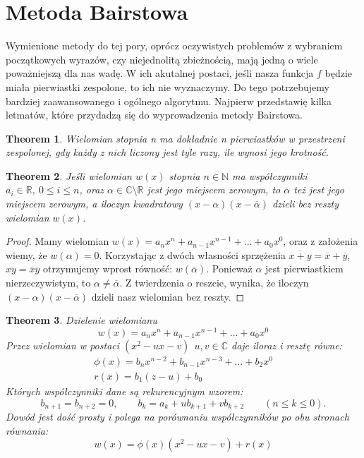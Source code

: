\documentclass[a4paper]{article}
\newtheorem{theorem}{Theorem}
\let\conjugate\overline
\begin{document}
\section{Metoda Bairstowa}
    Wymienione metody do tej pory, oprócz oczywistych problemów z wybraniem początkowych wyrazów, czy niejednolitą zbieżnością, mają
    jedną o wiele poważniejszą dla nas wadę. W ich akutalnej postaci, jeśli nasza funkcja $f$ będzie miała pierwiastki zespolone, to
    ich nie wyznaczymy. Do tego potrzebujemy bardziej zaawansowanego i ogólnego algorytmu. Najpierw przedstawię 
    kilka letmatów, które przydadzą się do wyprowadzenia metody Bairstowa.
    \begin{theorem}
        Wielomian stopnia n ma dokładnie n pierwiastków w przestrzeni zespolonej, gdy każdy z nich liczony jest tyle razy, ile wynosi jego krotność.
    \end{theorem}
    
    \begin{theorem}
        Jeśli wielomian $w(x)$ stopnia $n \in \mathbb{N}$ ma współczynniki 
        $a_i \in \mathbb{R},\ 0 \leq i \leq n$, oraz $\alpha \in \mathbb{C} \setminus \mathbb{R}$ jest jego 
        miejscem zerowym, to $\conjugate{\alpha}$ też jest jego miejscem zerowym, a iloczyn
        kwadratowy $(x - \alpha)(x - \conjugate{\alpha})$ dzieli bez reszty wielomian $w(x)$.
    \end{theorem}
    \begin{proof}
        Mamy wielomian $w(x) = a_{n}x^n + a_{n-1}x^{n-1} + \ldots + a_{0}x^0$, oraz z założenia wiemy, że
        $w(\alpha) = 0$. Korzystając z dwóch własności sprzężenia $\conjugate{x + y} = \conjugate{x} + \conjugate{y}$,
        ${\conjugate{xy} = \conjugate{x}\conjugate{y}}$ otrzymujemy wprost równość: $w(\conjugate{\alpha})$. Ponieważ
        $\alpha$ jest pierwiastkiem nierzeczywistym, to $\alpha \neq \conjugate{\alpha}$. Z twierdzenia o reszcie, wynika, że
        iloczyn $(x - \alpha)(x - \conjugate{\alpha})$ dzieli nasz wielomian bez reszty.
    \end{proof}

    \begin{theorem}
        Dzielenie wielomianu 
        \[
            w(x) = a_{n}x^n + a_{n-1}x^{n-1} + \ldots + a_{0}x^0
        \]
        Przez wielomian w postaci $(x^2 - ux - v) \ \ u,v \in \mathbb{C}$ daje iloraz i resztę równe:
        \[
            \begin{array}{c}
                \phi(x) = b_{n}x^{n-2} + b_{n-1}x^{n-3} + \ldots + b_{2}x^0 \\
                r(x) = b_{1}(z - u) + b_{0}
            \end{array}
        \]
        Których współczynniki dane są rekurencyjnym wzorem:
        \[
            b_{n+1} = b_{n+2} = 0, \qquad b_k = a_k + ub_{k+1} + vb_{k+2} \qquad (n \leq k \leq 0).  
        \tag{3}\]
        Dowód jest dość prosty i polega na porównaniu współczynników po obu stronach równania:
        \[
            w(x) = \phi(x)(x^2 - ux - v) + r(x)  
        \]
    \end{theorem}
\end{document}

